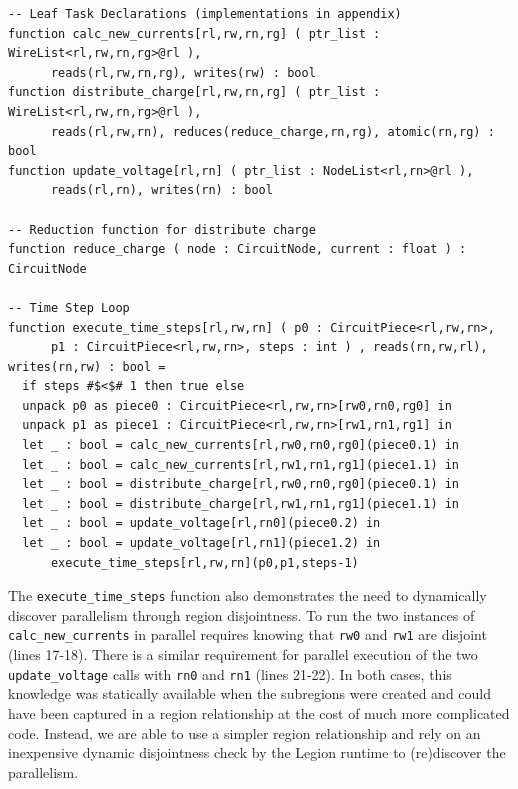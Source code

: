 \begin{lstlisting}[float={t},label={lst:loop},caption={Main Simulation Loop}]
-- Leaf Task Declarations (implementations in appendix)
function calc_new_currents[rl,rw,rn,rg] ( ptr_list : WireList<rl,rw,rn,rg>@rl ), 
      reads(rl,rw,rn,rg), writes(rw) : bool
function distribute_charge[rl,rw,rn,rg] ( ptr_list : WireList<rl,rw,rn,rg>@rl ), 
      reads(rl,rw,rn), reduces(reduce_charge,rn,rg), atomic(rn,rg) : bool 
function update_voltage[rl,rn] ( ptr_list : NodeList<rl,rn>@rl ), 
      reads(rl,rn), writes(rn) : bool

-- Reduction function for distribute charge
function reduce_charge ( node : CircuitNode, current : float ) : CircuitNode

-- Time Step Loop
function execute_time_steps[rl,rw,rn] ( p0 : CircuitPiece<rl,rw,rn>, 
      p1 : CircuitPiece<rl,rw,rn>, steps : int ) , reads(rn,rw,rl), writes(rn,rw) : bool = 
  if steps #$<$# 1 then true else
  unpack p0 as piece0 : CircuitPiece<rl,rw,rn>[rw0,rn0,rg0] in 
  unpack p1 as piece1 : CircuitPiece<rl,rw,rn>[rw1,rn1,rg1] in
  let _ : bool = calc_new_currents[rl,rw0,rn0,rg0](piece0.1) in
  let _ : bool = calc_new_currents[rl,rw1,rn1,rg1](piece1.1) in
  let _ : bool = distribute_charge[rl,rw0,rn0,rg0](piece0.1) in
  let _ : bool = distribute_charge[rl,rw1,rn1,rg1](piece1.1) in
  let _ : bool = update_voltage[rl,rn0](piece0.2) in
  let _ : bool = update_voltage[rl,rn1](piece1.2) in
      execute_time_steps[rl,rw,rn](p0,p1,steps-1)
\end{lstlisting}

The {\tt execute\_time\_steps} function also demonstrates the need to 
dynamically discover parallelism through region disjointness.  
To run the two instances of 
{\tt calc\_new\_currents} in parallel requires knowing that {\tt rw0}
and {\tt rw1} are disjoint (lines 17-18).  There is a similar requirement for parallel
execution of the two {\tt update\_voltage} calls with {\tt rn0} and {\tt rn1} (lines 21-22).  In
both cases, this knowledge was statically available when the subregions were created 
and could have been captured in a region relationship at the cost
of much more complicated code.  Instead, we are able to use a simpler region relationship
and rely on an inexpensive dynamic disjointness
check by the Legion runtime to (re)discover the parallelism.

